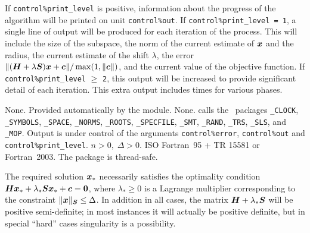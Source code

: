 \documentclass{galahad}
\newcommand{\packagename}{TREK}
\begin{document}

\galinfo
If {\tt control\%print\_level} is positive, information about the progress
of the algorithm will be printed on unit {\tt control\-\%\-out}.
If {\tt control\%print\_level = 1}, a single line of output will be produced
for each iteration of the process. This will include the size of the
subspace, the norm of the current estimate of ${\bm{x}}$ and the radius, the
current estimate of the shift $\lambda$, the error
$\|({\bm{H}}+\lambda{\bm{S}}) {\bm{x}} + {\bm{c}}\|/\max(1,\|{\bm{c}}\|)$, and
the current value of the objective function.
If {\tt control\%print\_level} $\geq$ {\tt 2}, this
output will be increased to provide significant detail of each iteration.
This extra output includes times for various phases.


\galgeneral

\galcommon None.
\galworkspace Provided automatically by the module.
\galroutines None.
\galmodules {\tt \packagename\_solve} calls the \galahad\ packages
{\tt \libraryname\_CLOCK},
{\tt \libraryname\_SY\-M\-BOLS},
{\tt \libraryname\_SPACE}, {\tt \libraryname\_\-NORMS},
{\tt \libraryname\_ROOTS}, {\tt \libraryname\_SPECFILE},
{\tt \libraryname\_SMT}, {\tt \libraryname\_RAND}, 
{\tt \libraryname\_TRS}, {\tt \libraryname\_SLS}, 
and
{\tt \libraryname\_MOP}.
\galio Output is under control of the arguments
{\tt control\%error}, {\tt control\%out} and {\tt control\%print\_level}.
\galrestrictions $n  >  0, \;  \Delta  >  0$.
\galportability ISO Fortran~95 + TR 15581 or Fortran~2003.
The package is thread-safe.


\galmethod
The required solution ${\bm{x}}_*$ necessarily satisfies the optimality condition
${\bm{H}} {\bm{x}}_* + \lambda_* {\bm{S}} {\bm{x}}_* + {\bm{c}} = {\bm{0}}$,
where $\lambda_* \geq 0$ is a Lagrange
multiplier corresponding to the constraint $\|{\bm{x}}\|_{{\bm{S}}}  \leq  \Delta$.
In addition in all cases, the matrix ${\bm{H}} + \lambda_* {\bm{S}}$ will be positive
semi-definite; in most instances it will actually be positive definite, 
but in special ``hard'' cases singularity is a possibility.
\end{document}
